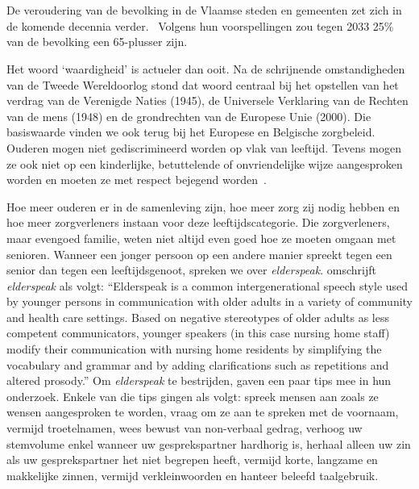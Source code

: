 
\chapter{}
\label{ch:inleiding}

De veroudering van de bevolking in de Vlaamse steden en gemeenten zet zich in de komende  decennia verder.~\autocite{StatistiekVlaanderen2018}
Volgens hun voorspellingen zou tegen 2033 25\% van de bevolking een 65-plusser zijn.

Het woord `waardigheid' is actueler dan ooit.
Na de schrijnende omstandigheden van de Tweede Wereldoorlog stond dat woord centraal bij het opstellen van het verdrag van de Verenigde Naties (1945), de Universele Verklaring van de Rechten van de mens (1948) en de grondrechten van de Europese Unie (2000).
Die basiswaarde vinden we ook terug bij het Europese en Belgische zorgbeleid. Ouderen mogen niet gediscrimineerd worden op vlak van leeftijd. Tevens mogen ze ook niet op een kinderlijke, betuttelende of onvriendelijke wijze aangesproken worden en moeten ze met respect bejegend worden~\autocite{Campens}.

Hoe meer ouderen er in de samenleving zijn, hoe meer zorg zij nodig hebben en hoe meer zorgverleners instaan voor deze leeftijdscategorie.
Die zorgverleners, maar evengoed familie, weten niet altijd even goed hoe ze moeten omgaan met senioren.
Wanneer een jonger persoon op een andere manier spreekt tegen een senior dan tegen een leeftijdsgenoot, spreken we over \textit{elderspeak}. \textcite{Williams2011} omschrijft \textit{elderspeak} als volgt: ``Elderspeak is a common intergenerational speech style used by younger persons in communication with older adults in a variety of community and health care settings. Based on negative stereotypes of older adults as less competent communicators, younger speakers (in this case nursing home staff) modify their communication with nursing home residents by simplifying the vocabulary and grammar and by adding clarifications such as repetitions and altered prosody.'' Om \textit{elderspeak} te bestrijden, gaven \textcite{Wick2007} een paar tips mee in hun onderzoek.
Enkele van die tips gingen als volgt: spreek mensen aan zoals ze wensen aangesproken te worden, vraag om ze aan te spreken met de voornaam, vermijd troetelnamen, wees bewust van non-verbaal gedrag, verhoog uw stemvolume enkel wanneer uw gesprekspartner hardhorig is, herhaal alleen uw zin als uw gesprekspartner het niet begrepen heeft, vermijd korte, langzame en makkelijke zinnen, vermijd verkleinwoorden en hanteer beleefd taalgebruik.

